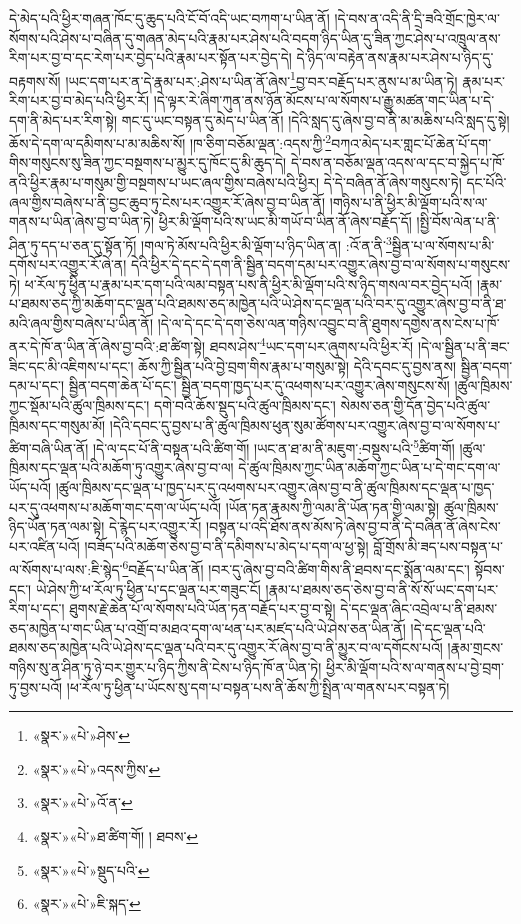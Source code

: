 དེ་མེད་པའི་ཕྱིར་གཞན་ཁོང་དུ་ཆུད་པའི་ངོ་བོ་འདི་ཡང་བཀག་པ་ཡིན་ནོ། །དེ་བས་ན་འདི་ནི་དྲི་ཟའི་གྲོང་ཁྱེར་ལ་སོགས་པའི་ཤེས་པ་བཞིན་དུ་གཞན་མེད་པའི་རྣམ་པར་ཤེས་པའི་བདག་ཉིད་ཡིན་དུ་ཟིན་ཀྱང་ཤེས་པ་འཁྲུལ་ནས་རིག་པར་བྱ་བ་དང་རེག་པར་བྱེད་པའི་རྣམ་པར་སྟོན་པར་བྱེད་དེ། དེ་ཉིད་ལ་བརྟེན་ནས་རྣམ་པར་ཤེས་པ་ཉིད་དུ་བརྟགས་སོ། །ཡང་དག་པར་ན་དེ་རྣམ་པར་:ཤེས་པ་ཡིན་ནོ་ཞེས་\footnote{«སྣར་»«པེ་»ཤེས་}བྱ་བར་བརྗོད་པར་ནུས་པ་མ་ཡིན་ཏེ། རྣམ་པར་རིག་པར་བྱ་བ་མེད་པའི་ཕྱིར་རོ། །དེ་ལྟར་རེ་ཞིག་ཀུན་ནས་ཉོན་མོངས་པ་ལ་སོགས་པ་རྒྱུ་མཚན་གང་ཡིན་པ་དེ་དག་ནི་མེད་པར་རིག་སྟེ། གང་དུ་ཡང་བསྟན་དུ་མེད་པ་ཡིན་ནོ། །དེའི་སླད་དུ་ཞེས་བྱ་བ་ནི་མ་མཆིས་པའི་སླད་དུ་སྟེ། ཆོས་དེ་དག་ལ་དམིགས་པ་མ་མཆིས་སོ། །ཁ་ཅིག་བཅོམ་ལྡན་:འདས་ཀྱི་\footnote{«སྣར་»«པེ་»འདས་ཀྱིས་}བཀའ་མེད་པར་གླང་པོ་ཆེན་པོ་དག་གིས་གསུངས་སུ་ཟིན་ཀྱང་བསྔགས་པ་མྱུར་དུ་ཁོང་དུ་མི་ཆུད་དེ། དེ་བས་ན་བཅོམ་ལྡན་འདས་ལ་དང་བ་སྐྱེད་པ་ཁོ་ནའི་ཕྱིར་རྣམ་པ་གསུམ་གྱི་བསྔགས་པ་ཡང་ཞལ་གྱིས་བཞེས་པའི་ཕྱིར། དེ་དེ་བཞིན་ནོ་ཞེས་གསུངས་ཏེ། དང་པོའི་ཞལ་གྱིས་བཞེས་པ་ནི་བྱང་ཆུབ་ཏུ་ངེས་པར་འགྱུར་རོ་ཞེས་བྱ་བ་ཡིན་ནོ། །གཉིས་པ་ནི་ཕྱིར་མི་ལྡོག་པའི་ས་ལ་གནས་པ་ཡིན་ཞེས་བྱ་བ་ཡིན་ཏེ། ཕྱིར་མི་ལྡོག་པའི་ས་ཡང་མི་གཡོ་བ་ཡིན་ནོ་ཞེས་བརྗོད་དོ། །སྤྱི་བོས་ལེན་པ་ནི་ཤིན་ཏུ་དད་པ་ཅན་དུ་སྟོན་ཏོ། །གལ་ཏེ་མོས་པའི་ཕྱིར་མི་ལྡོག་པ་ཉིད་ཡིན་ན། :འོ་ན་ནི་\footnote{«སྣར་»«པེ་»འོ་ན་}སྦྱིན་པ་ལ་སོགས་པ་མི་དགོས་པར་འགྱུར་རོ་ཞེ་ན། དེའི་ཕྱིར་དེ་དང་དེ་དག་ནི་སྦྱིན་བདག་དམ་པར་འགྱུར་ཞེས་བྱ་བ་ལ་སོགས་པ་གསུངས་ཏེ། ཕ་རོལ་ཏུ་ཕྱིན་པ་རྣམ་པར་དག་པའི་ལམ་བསྟན་པས་ནི་ཕྱིར་མི་ལྡོག་པའི་ས་ཉིད་གསལ་བར་བྱེད་པའོ། །རྣམ་པ་ཐམས་ཅད་ཀྱི་མཆོག་དང་ལྡན་པའི་ཐམས་ཅད་མཁྱེན་པའི་ཡེ་ཤེས་དང་ལྡན་པའི་བར་དུ་འགྱུར་ཞེས་བྱ་བ་ནི་ཐ་མའི་ཞལ་གྱིས་བཞེས་པ་ཡིན་ནོ། །དེ་ལ་དེ་དང་དེ་དག་ཅེས་ལན་གཉིས་འབྱུང་བ་ནི་ཐུགས་དགྱེས་ནས་ངེས་པ་ཁོ་ནར་དེ་ཁོ་ན་ཡིན་ནོ་ཞེས་བྱ་བའི་:ཐ་ཚིག་སྟེ། ཐབས་ཤེས་\footnote{«སྣར་»«པེ་»ཐ་ཚིག་གོ། ། ཐབས་}ཡང་དག་པར་ཞུགས་པའི་ཕྱིར་རོ། །དེ་ལ་སྦྱིན་པ་ནི་ཟང་ཟིང་དང་མི་འཇིགས་པ་དང་། ཆོས་ཀྱི་སྦྱིན་པའི་བྱེ་བྲག་གིས་རྣམ་པ་གསུམ་སྟེ། དེའི་དབང་དུ་བྱས་ནས། སྦྱིན་བདག་དམ་པ་དང་། སྦྱིན་བདག་ཆེན་པོ་དང་། སྦྱིན་བདག་ཁྱད་པར་དུ་འཕགས་པར་འགྱུར་ཞེས་གསུངས་སོ། །ཚུལ་ཁྲིམས་ཀྱང་སྡོམ་པའི་ཚུལ་ཁྲིམས་དང་། དགེ་བའི་ཆོས་སྡུད་པའི་ཚུལ་ཁྲིམས་དང་། སེམས་ཅན་གྱི་དོན་བྱེད་པའི་ཚུལ་ཁྲིམས་དང་གསུམ་མོ། །དེའི་དབང་དུ་བྱས་པ་ནི་ཚུལ་ཁྲིམས་ཕུན་སུམ་ཚོགས་པར་འགྱུར་ཞེས་བྱ་བ་ལ་སོགས་པ་ཚིག་བཞི་ཡིན་ནོ། །དེ་ལ་དང་པོ་ནི་བསྟན་པའི་ཚིག་གོ། །ཡང་ན་ཐ་མ་ནི་མཇུག་:བསྡུས་པའི་\footnote{«སྣར་»«པེ་»སྡུད་པའི་}ཚིག་གོ། །ཚུལ་ཁྲིམས་དང་ལྡན་པའི་མཆོག་ཏུ་འགྱུར་ཞེས་བྱ་བ་ལ། དེ་ཚུལ་ཁྲིམས་ཀྱང་ཡིན་མཆོག་ཀྱང་ཡིན་པ་དེ་གང་དག་ལ་ཡོད་པའོ། །ཚུལ་ཁྲིམས་དང་ལྡན་པ་ཁྱད་པར་དུ་འཕགས་པར་འགྱུར་ཞེས་བྱ་བ་ནི་ཚུལ་ཁྲིམས་དང་ལྡན་པ་ཁྱད་པར་དུ་འཕགས་པ་མཆོག་གང་དག་ལ་ཡོད་པའོ། །ཡོན་ཏན་རྣམས་ཀྱི་ལམ་ནི་ཡོན་ཏན་གྱི་ལམ་སྟེ། ཚུལ་ཁྲིམས་ཉིད་ཡོན་ཏན་ལམ་སྟེ། དེ་རྙེད་པར་འགྱུར་རོ། །བསྟན་པ་འདི་ཐོས་ནས་མོས་ཏེ་ཞེས་བྱ་བ་ནི་དེ་བཞིན་ནོ་ཞེས་ངེས་པར་འཛིན་པའོ། །བཟོད་པའི་མཆོག་ཅེས་བྱ་བ་ནི་དམིགས་པ་མེད་པ་དག་ལ་ཕྱ་སྟེ། བློ་གྲོས་མི་ཟད་པས་བསྟན་པ་ལ་སོགས་པ་ལས་:ཇི་སྙེད་\footnote{«སྣར་»«པེ་»ཇི་སྐད་}བརྗོད་པ་ཡིན་ནོ། །བར་དུ་ཞེས་བྱ་བའི་ཚིག་གིས་ནི་ཐབས་དང་སྨོན་ལམ་དང་། སྟོབས་དང་། ཡེ་ཤེས་ཀྱི་ཕ་རོལ་ཏུ་ཕྱིན་པ་དང་ལྡན་པར་གཟུང་ངོ། །རྣམ་པ་ཐམས་ཅད་ཅེས་བྱ་བ་ནི་སོ་སོ་ཡང་དག་པར་རིག་པ་དང་། ཐུགས་རྗེ་ཆེན་པོ་ལ་སོགས་པའི་ཡོན་ཏན་བརྗོད་པར་བྱ་བ་སྟེ། དེ་དང་ལྡན་ཞིང་འབྲེལ་པ་ནི་ཐམས་ཅད་མཁྱེན་པ་གང་ཡིན་པ་འགྲོ་བ་མཐའ་དག་ལ་ཕན་པར་མཛད་པའི་ཡེ་ཤེས་ཅན་ཡིན་ནོ། །དེ་དང་ལྡན་པའི་ཐམས་ཅད་མཁྱེན་པའི་ཡེ་ཤེས་དང་ལྡན་པའི་བར་དུ་འགྱུར་རོ་ཞེས་བྱ་བ་ནི་མྱུར་བ་ལ་དགོངས་པའོ། །རྣམ་གྲངས་གཉིས་སུ་ན་ཤིན་ཏུ་ཉེ་བར་གྱུར་པ་ཉིད་ཀྱིས་ནི་ངེས་པ་ཉིད་ཁོ་ན་ཡིན་ཏེ། ཕྱིར་མི་ལྡོག་པའི་ས་ལ་གནས་པ་བྱེ་བྲག་ཏུ་བྱས་པའོ། །ཕ་རོལ་ཏུ་ཕྱིན་པ་ཡོངས་སུ་དག་པ་བསྟན་པས་ནི་ཆོས་ཀྱི་སྤྲིན་ལ་གནས་པར་བསྟན་ཏེ། 